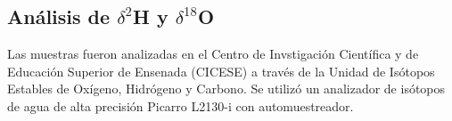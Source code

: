 \subsection{Análisis de $\delta^{2}$H y $\delta^{18}$O}
\label{sec:analisis_isotopico_metodo}

Las muestras fueron analizadas en el Centro de Invstigación Científica y 
de Educación Superior de Ensenada (CICESE) a través de la Unidad de Isótopos 
Estables de Oxígeno, Hidrógeno y Carbono. Se utilizó un analizador de isótopos 
de agua de alta precisión Picarro L2130-i con automuestreador. 

